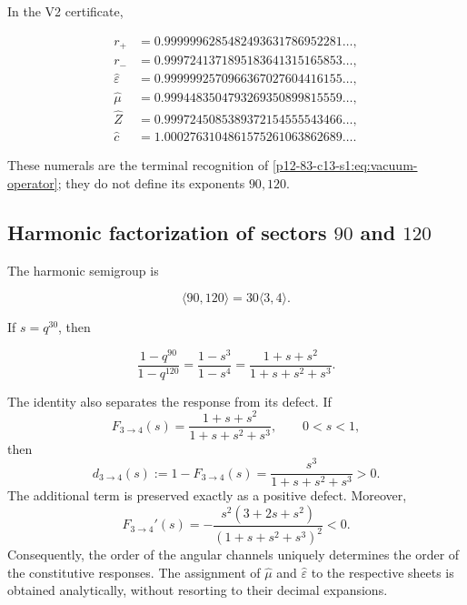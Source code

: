 In the V2 certificate,

\begin{align*}
r_+&=0.9999996285482493631786952281\ldots,\\
r_-&=0.9997241371895183641315165853\ldots,\\
\widehat\varepsilon&=0.9999992570966367027604416155\ldots,\\
\widehat\mu&=0.9994483504793269350899815559\ldots,\\
\widehat Z&=0.9997245085389372154555543466\ldots,\\
\widehat c&=1.0002763104861575261063862689\ldots.
\end{align*}

These numerals are the terminal recognition of \cref{p12-83-c13-s1:eq:vacuum-operator}; they do not define its exponents \(90,120\).

\subsection{Harmonic factorization of sectors \texorpdfstring{\(90\)}{90} and \texorpdfstring{\(120\)}{120}}

The harmonic semigroup is

\[
\langle90,120\rangle=30\langle3,4\rangle.
\]

If \(s=q^{30}\), then

\begin{equation}
\frac{1-q^{90}}{1-q^{120}}
=\frac{1-s^3}{1-s^4}
=\frac{1+s+s^2}{1+s+s^2+s^3}.
\label{p12-83-c13-s1:eq:three-four-completion}
\end{equation}

The identity also separates the response from its defect. If
\[
F_{3\to4}(s)=\frac{1+s+s^2}{1+s+s^2+s^3},
\qquad 0<s<1,
\]
then
\begin{equation}
d_{3\to4}(s):=1-F_{3\to4}(s)
=\frac{s^3}{1+s+s^2+s^3}>0.
\label{p12-83-c13-s1:eq:vacuum-defect34}
\end{equation}
The additional term is preserved exactly as a positive
defect. Moreover,
\begin{equation}
F_{3\to4}'(s)
=-\frac{s^2(3+2s+s^2)}{(1+s+s^2+s^3)^2}<0.
\label{p12-83-c13-s1:eq:vacuum-monotonic34}
\end{equation}
Consequently, the order of the angular channels uniquely determines
the order of the constitutive responses. The assignment of
\(\widehat\mu\) and \(\widehat\varepsilon\) to the respective sheets is obtained
analytically, without resorting to their decimal expansions.

